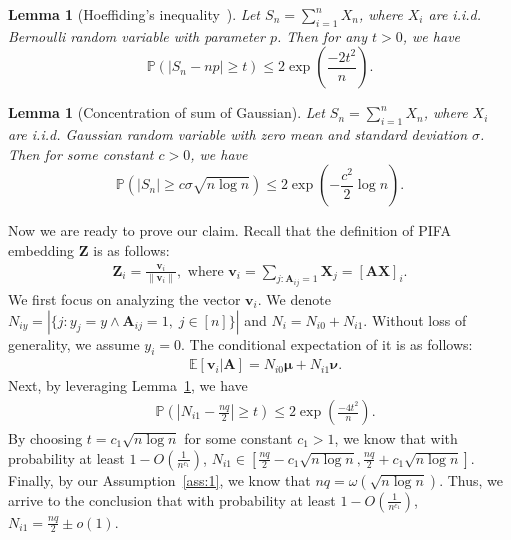 \documentclass{article} \usepackage{iclr2022_conference,times}
\newtheorem{lemma}[theorem]{Lemma}
\begin{document}
\begin{lemma}	[Hoeffiding's inequality~\citep{hoeffding1994probability}]\label{lma:Hoeffding}
	Let $S_n=\sum_{i=1}^{n}X_n$, where $X_i$ are i.i.d. Bernoulli random variable with parameter $p$. Then for any $t>0$, we have
	\begin{equation}
		\mathbb{P}\left(|S_n - np|\geq t\right) \leq 2 \exp(\frac{-2t^2}{n}).
	\end{equation}
\end{lemma}

\begin{lemma}	[Concentration of sum of Gaussian]\label{lma:gauss_concentration}
	Let $S_n=\sum_{i=1}^{n}X_n$, where $X_i$ are i.i.d. Gaussian random variable with zero mean and standard deviation $\sigma$. Then for some constant $c>0$, we have
	\begin{equation}
		\mathbb{P}\left(|S_n|\geq c\sigma \sqrt{n\log n }\right) \leq 2 \exp(-\frac{c^2}{2}\log n).
	\end{equation}
\end{lemma}

Now we are ready to prove our claim. Recall that the definition of PIFA embedding $\mathbf{Z}$ is as follows:
\begin{align}
	\mathbf{Z}_i=\frac{\mathbf{v}_i}{\|\mathbf{v}_i\|},\text{ where }\mathbf{v}_i=\sum_{j:\mathbf{A}_{ij}=1}\mathbf{X}_j=\left[\mathbf{A}\mathbf{X}\right]_i.
\end{align}
We first focus on analyzing the vector $\mathbf{v}_i$. We denote $N_{iy}=|\{j:y_j=y \wedge \mathbf{A}_{ij}=1,\;j\in[n]\}|$ and $N_i=N_{i0}+N_{i1}$. Without loss of generality, we assume $y_i=0$. The conditional expectation of it is as follows:
\begin{align}
	& \mathbb{E}\left[\mathbf{v}_i |\mathbf{A}\right]= N_{i0}\boldsymbol{\mu} + N_{i1}\boldsymbol{\nu}.
\end{align}
Next, by leveraging Lemma~\ref{lma:Hoeffding}, we have
\begin{align}
	& \mathbb{P}(|N_{i1}-\frac{nq}{2}|\geq t) \leq 2\exp(\frac{-4t^2}{n}).
\end{align}
By choosing $t = c_1\sqrt{n\log n}$ for some constant $c_1>1$, we know that with probability at least $1-O(\frac{1}{n^{c_1}})$, $N_{i1}\in [\frac{nq}{2}-c_1\sqrt{n\log n},\frac{nq}{2}+c_1\sqrt{n\log n}]$. Finally, by our Assumption~\ref{ass:1}, we know that $nq = \omega(\sqrt{n\log n})$. Thus, we arrive to the conclusion that with probability at least $1-O(\frac{1}{n^{c_1}})$, $N_{i1}=\frac{nq}{2}\pm o(1)$.
\end{document}
